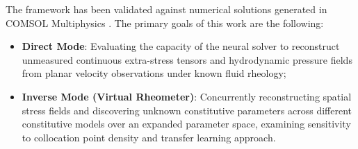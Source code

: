 The framework has been validated against numerical solutions
generated in COMSOL Multiphysics \cite{comsol_multiphysics}. The primary goals
of this work are the following:
\begin{itemize}
    \item \textbf{Direct Mode}: Evaluating the
    capacity of the neural solver to reconstruct unmeasured continuous extra-stress
    tensors and hydrodynamic pressure fields from planar velocity observations
    under known fluid rheology;
    \item \textbf{Inverse Mode (Virtual Rheometer)}: Concurrently reconstructing
    spatial stress fields and discovering unknown constitutive parameters across
    different constitutive models over an expanded parameter space, examining sensitivity to collocation point
    density and transfer learning approach.
\end{itemize}
